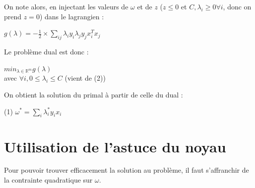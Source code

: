 \documentclass{article}
\begin{document}
On note alors, en injectant les valeurs de $\omega$ et de $z$ ($z \leq 0$ et $C, \lambda_i \geq 0 \forall i$, donc on prend $z=0$) dans le lagrangien :\\

              \begin{center}
              $g(\lambda) = -\frac{1}{2} \times \sum_{ij} \lambda_i y_i \lambda_j y_j x_i^{T} x_j$
              \end{center}

Le problème dual est donc :\\

             \begin{center}
             $min_{\lambda \in \mathbb{R}^{m}} g(\lambda)$\\ 
             avec $\forall i, 0 \leq \lambda_i \leq C$ (vient de (2))\\
             \end{center}

On obtient la solution du primal à partir de celle du dual :

             \begin{center}
             (1) $\omega^{*} = \sum_i \lambda^{*}_i y_i x_i$
             \end{center}

\section{Utilisation de l'astuce du noyau}

Pour pouvoir trouver efficacement la solution au problème, il faut s'affranchir de la contrainte quadratique sur $\omega$.\\
\end{document}

